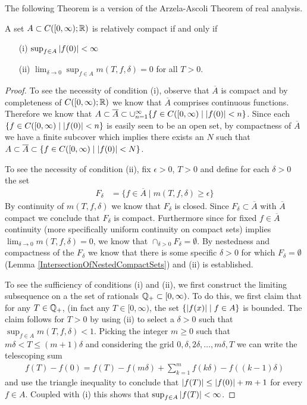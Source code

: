 The following Theorem is a version of the Arzela-Ascoli Theorem of
real analysis.
\begin{thm}\label{ArzelaAscoliTheorem}A set $A
  \subset C([0,\infty); \mathbb{R})$ is relatively compact if and only if 
\begin{itemize}
\item[(i)]$\sup_{f \in A} \left \vert f(0) \right \vert < \infty$
\item[(ii)]$\lim_{\delta \to 0} \sup_{f \in A} m(T, f, \delta) = 0$
  for all $T > 0$.
\end{itemize}
\end{thm}
\begin{proof}
To see the necessity of condition (i), observe that $\overline{A}$ is
compact and by completeness of $C([0,\infty); \mathbb{R})$ we know that
$\overline{A}$ comprises continuous functions.  Therefore we know that
$A \subset \overline{A} \subset \cup_{n=1}^\infty \lbrace f \in
C([0,\infty) \mid
\left \vert f(0) \right \vert < n\rbrace$.  Since each $\lbrace f \in
C([0,\infty) \mid
\left \vert f(0) \right \vert < n\rbrace$ is easily seen to be an open set, by
compactness of $\overline{A}$ we have a finite subcover which implies
there exists an $N$ such that $A \subset \overline{A} \subset \lbrace f \in
C([0,\infty) \mid
\left \vert f(0) \right \vert < N\rbrace$.

To see the necessity of condition (ii), fix $\epsilon > 0$, $T > 0$
and define for each $\delta > 0$ the set 
\begin{align*}
F_\delta &= \lbrace f \in \overline{A} \mid m(T, f, \delta) \geq
\epsilon \rbrace
\end{align*}
By continuity of $m(T, f, \delta)$ we know that $F_\delta$ is closed.
Since $F_\delta \subset \overline{A}$ with $\overline{A}$ compact we
conclude that $F_\delta$ is compact.  Furthermore since for fixed $f
\in \overline{A}$ continuity (more specifically uniform continuity on compact
sets) implies $\lim_{\delta \to 0} m(T,f,\delta) = 0$, we know that
$\cap_{\delta > 0} F_\delta = \emptyset$.  By nestedness and
compactness of the
$F_\delta$ we know that there is some specific $\delta>0$ for which $F_\delta =
\emptyset$ (Lemma \ref{IntersectionOfNestedCompactSets}) and (ii) is established.

To see the sufficiency of conditions (i) and (ii), we first construct
the limiting subsequence on a the set of rationals $\mathbb{Q}_+
\subset [0,\infty)$.  To do this, we first claim that for any $T \in
\mathbb{Q}_+$, (in fact any $T \in [0,\infty)$, the set $\lbrace
\left \vert f(x) \right \vert \mid f \in A \rbrace$ is bounded.  The claim follows for
$T>0$ by using (ii) to select a $\delta > 0$ such that $\sup_{f \in A} m(T, f,
\delta) < 1$.  Picking the integer $m \geq 0$ such that $m \delta < T \leq
(m+1)\delta$ and considering  the grid $0, \delta, 2\delta, \dotsc,
m\delta, T$ we can write the telescoping sum
\begin{align*}
f(T) - f(0) = f(T) - f(m\delta) + \sum_{k=1}^m f(k \delta) - f((k-1)\delta)
\end{align*}
and use the triangle inequality to conclude that $\left \vert f(T) \right \vert
\leq \left \vert f(0) \right \vert + m+1$ for every $f \in A$.  Coupled with (i) this shows that
$\sup_{f \in A} \left \vert f(T) \right \vert < \infty$.


\end{proof}
